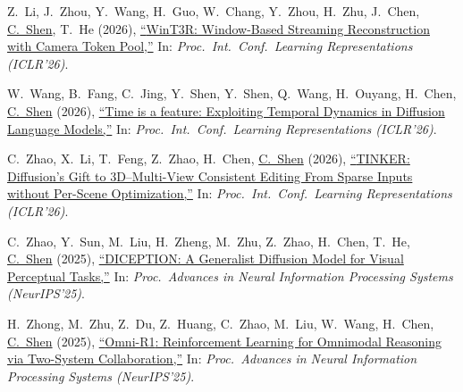 \documentclass[9pt, a4paper]{article}
\newcommand{\years}[1]{\marginnote{\scriptsize #1}}
\def\highlight{\uline}
\begin{document}
\years{2026} Z.~Li, J.~Zhou, Y.~Wang, H.~Guo, W.~Chang, Y.~Zhou, H.~Zhu, J.~Chen, \highlight{C.~Shen}, T.~He (2026),
\href{http://www.google.com/search?lr=&ie=UTF-8&oe=UTF-8&q=WinT3R%3A+Window-Based+Streaming+Reconstruction+with+Camera+Token+Pool+Zizun+Li%2C+Jianjun+Zhou%2C+Yifan+Wang%2C+Haoyu+Guo%2C+Wenzheng+Chang%2C+Yang+Zhou%2C+Haoyi+Zhu%2C+Junyi+Chen%2C+Chunhua+Shen%2C+Tong+He}{``{WinT3R}: Window-Based Streaming Reconstruction with Camera Token Pool,{}''}
In: \emph{Proc.\ Int.\ Conf.\  Learning Representations (ICLR'26)}.

\medskip

\years{2026} W.~Wang, B.~Fang, C.~Jing, Y.~Shen, Y.~Shen, Q.~Wang, H.~Ouyang, H.~Chen, \highlight{C.~Shen} (2026),
\href{http://www.google.com/search?lr=&ie=UTF-8&oe=UTF-8&q=Time+is+a+feature%3A+Exploiting+Temporal+Dynamics+in+Diffusion+Language+Models+Wen+Wang%2C+Bozhen+Fang%2C+Chenchen+Jing%2C+Yongliang+Shen%2C+Yangyi+Shen%2C+Qiuyu+Wang%2C+Hao+Ouyang%2C+Hao+Chen%2C+Chunhua+Shen}{``Time is a feature: Exploiting Temporal Dynamics in Diffusion Language Models,{}''}
In: \emph{Proc.\ Int.\ Conf.\  Learning Representations (ICLR'26)}.

\medskip

\years{2026} C.~Zhao, X.~Li, T.~Feng, Z.~Zhao, H.~Chen, \highlight{C.~Shen} (2026),
\href{http://www.google.com/search?lr=&ie=UTF-8&oe=UTF-8&q=TINKER%3A+Diffusion%27s+Gift+to+3D--Multi-View+Consistent+Editing+From+Sparse+Inputs+without+Per-Scene+Optimization+Canyu+Zhao%2C+Xiaoman+Li%2C+Tianjian+Feng%2C+Zhiyue+Zhao%2C+Hao+Chen%2C+Chunhua+Shen}{``{TINKER}: Diffusion's Gift to 3D--Multi-View Consistent Editing From Sparse Inputs without Per-Scene Optimization,{}''}
In: \emph{Proc.\ Int.\ Conf.\  Learning Representations (ICLR'26)}.

\medskip

\years{2025} C.~Zhao, Y.~Sun, M.~Liu, H.~Zheng, M.~Zhu, Z.~Zhao, H.~Chen, T.~He, \highlight{C.~Shen} (2025),
\href{http://www.google.com/search?lr=&ie=UTF-8&oe=UTF-8&q=DICEPTION%3A+A+Generalist+Diffusion+Model+for+Visual+Perceptual+Tasks+Canyu+Zhao%2C+Yanlong+Sun%2C+Mingyu+Liu%2C+Huanyi+Zheng%2C+Muzhi+Zhu%2C+Zhiyue+Zhao%2C+Hao+Chen%2C+Tong+He%2C+Chunhua+Shen}{``DICEPTION: A Generalist Diffusion Model for Visual Perceptual Tasks,{}''}
In: \emph{Proc.\ Advances in Neural Information Processing Systems (NeurIPS'25)}.

\medskip

\years{2025} H.~Zhong, M.~Zhu, Z.~Du, Z.~Huang, C.~Zhao, M.~Liu, W.~Wang, H.~Chen, \highlight{C.~Shen} (2025),
\href{http://www.google.com/search?lr=&ie=UTF-8&oe=UTF-8&q=Omni-R1%3A+Reinforcement+Learning+for+Omnimodal+Reasoning+via+Two-System+Collaboration+Hao+Zhong%2C+Muzhi+Zhu%2C+Zongze+Du%2C+Zheng+Huang%2C+Canyu+Zhao%2C+Mingyu+Liu%2C+Wen+Wang%2C+Hao+Chen%2C+Chunhua+Shen}{``{Omni-R1}: Reinforcement Learning for Omnimodal Reasoning via Two-System Collaboration,{}''}
In: \emph{Proc.\ Advances in Neural Information Processing Systems (NeurIPS'25)}.
\end{document}
